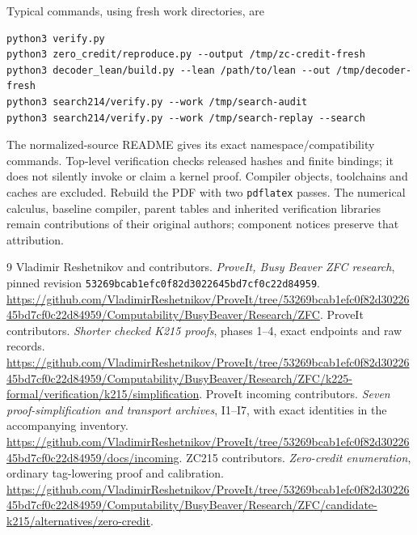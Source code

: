 \documentclass[11pt]{article}
\newcommand{\code}[1]{\texttt{\small #1}}
\begin{document}
Typical commands, using fresh work directories, are
\begin{Verbatim}[fontsize=\small]
python3 verify.py
python3 zero_credit/reproduce.py --output /tmp/zc-credit-fresh
python3 decoder_lean/build.py --lean /path/to/lean --out /tmp/decoder-fresh
python3 search214/verify.py --work /tmp/search-audit
python3 search214/verify.py --work /tmp/search-replay --search
\end{Verbatim}
The normalized-source README gives its exact namespace/compatibility commands.
Top-level verification checks released hashes and finite bindings; it does not
silently invoke or claim a kernel proof. Compiler objects, toolchains and caches
are excluded. Rebuild the PDF with two \code{pdflatex} passes. The numerical
calculus, baseline compiler, parent tables and inherited verification libraries
remain contributions of their original authors; component notices preserve
that attribution.

\begin{thebibliography}{9}
 Vladimir Reshetnikov and contributors.
\textit{ProveIt, Busy Beaver ZFC research}, pinned revision
\code{53269bcab1efc0f82d3022645bd7cf0c22d84959}.
\url{https://github.com/VladimirReshetnikov/ProveIt/tree/53269bcab1efc0f82d3022645bd7cf0c22d84959/Computability/BusyBeaver/Research/ZFC}.
 ProveIt contributors.
\textit{Shorter checked K215 proofs}, phases 1--4, exact endpoints and raw records.
\url{https://github.com/VladimirReshetnikov/ProveIt/tree/53269bcab1efc0f82d3022645bd7cf0c22d84959/Computability/BusyBeaver/Research/ZFC/k225-formal/verification/k215/simplification}.
 ProveIt incoming contributors.
\textit{Seven proof-simplification and transport archives}, I1--I7, with exact
identities in the accompanying inventory.
\url{https://github.com/VladimirReshetnikov/ProveIt/tree/53269bcab1efc0f82d3022645bd7cf0c22d84959/docs/incoming}.
 ZC215 contributors.
\textit{Zero-credit enumeration}, ordinary tag-lowering proof and calibration.
\url{https://github.com/VladimirReshetnikov/ProveIt/tree/53269bcab1efc0f82d3022645bd7cf0c22d84959/Computability/BusyBeaver/Research/ZFC/candidate-k215/alternatives/zero-credit}.
\end{thebibliography}
\end{document}
